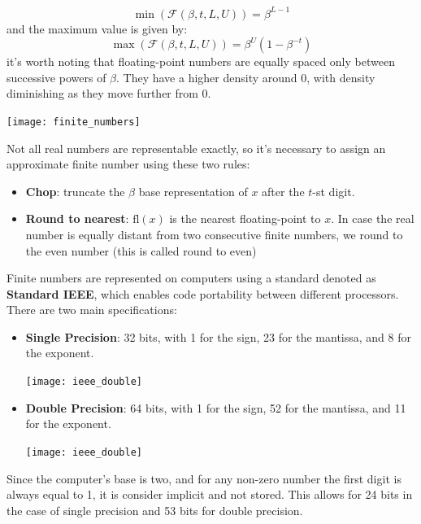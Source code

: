 \documentclass{article}
\begin{document}
$$\min(\mathcal{F}(\beta,t,L,U))=\beta^{L-1}$$
and the maximum value is given by:
$$\max(\mathcal{F}(\beta,t,L,U))=\beta^U(1-\beta^{-t})$$
it's worth noting that floating-point numbers are equally spaced only between
successive powers of $\beta$. They have a higher density around 0, with
density diminishing as they move further from 0.
\begin{example}
   \begin{center}
       \texttt{[image: finite\_numbers]}
   \end{center} 
\end{example}
Not all real numbers are representable exactly, so it's necessary to assign an
approximate finite number using these two rules:
\begin{itemize}
    \item \textbf{Chop}: truncate the $\beta$ base representation of $x$ after
        the $t$-st digit.
    \item \textbf{Round to nearest}: $\text{fl}(x)$ is the nearest
        floating-point to $x$. In case the real number is equally distant from
        two consecutive finite numbers, we round to the even number (this is
        called round to even)
\end{itemize}
Finite numbers are represented on computers using a standard denoted as \textbf{Standard IEEE}, 
which enables code portability between different processors. There are two
main specifications:
\begin{itemize}
    \item \textbf{Single Precision}: 32 bits, with 1 for the sign, 23 for the
        mantissa, and 8 for the exponent.
        \begin{center}
            \texttt{[image: ieee\_double]}
        \end{center}
    \item \textbf{Double Precision}: 64 bits, with 1 for the sign, 52 for the
        mantissa, and 11 for the exponent.
        \begin{center}
            \texttt{[image: ieee\_double]}
        \end{center}
\end{itemize}
Since the computer's base is two, and for any non-zero number the first digit
is always equal to 1, it is consider implicit and not stored. This allows for
24 bits in the case of single precision and 53 bits for double precision.
\end{document}

